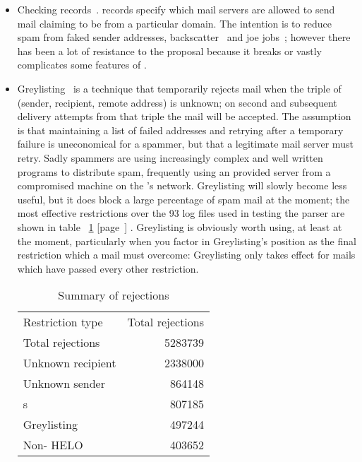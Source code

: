\documentclass[a4paper,12pt,draft]{article}
\newcommand{\refwithpage}[1]{%
    \empty{}\ref{#1} [page~\pageref{#1}]%
}
\begin{document}
\begin{itemize}

    \item Checking \SPF{} records~\cite{openspf, Wikipedia-spf}.
        \SPF{}\label{spf introduction}
        records specify which mail servers are allowed to send mail
        claiming to be from a particular domain.  The intention is to
        reduce spam from faked sender addresses,
        backscatter~\cite{postfix-backscatter} and joe
        jobs~\cite{Wikipedia-joe-job}; however there has been a lot of
        resistance to the proposal because it breaks or vastly complicates
        some features of \SMTP{}\@.

    \item Greylisting~\cite{greylisting} is a technique that temporarily
        rejects mail when the triple of (sender, recipient, remote \IP{}
        address) is unknown; on second and subsequent delivery attempts
        from that triple the mail will be accepted.  The assumption is that
        maintaining a list of failed addresses and retrying after a
        temporary failure is uneconomical for a spammer, but that a
        legitimate mail server must retry.  Sadly spammers are using
        increasingly complex and well written programs to distribute spam,
        frequently using an \ISP{} provided \SMTP{} server from a
        compromised machine on the \ISP{}'s network.  Greylisting will
        slowly become less useful, but it does block a large percentage of
        spam mail at the moment; the most effective restrictions over the
        93 log files used in testing the parser are shown in
        table~\refwithpage{Summary of rejections}.  Greylisting is
        obviously worth using, at least at the moment, particularly when
        you factor in Greylisting's position as the final restriction which
        a mail must overcome: Greylisting only takes effect for mails which
        have passed every other restriction.

        \begin{table}[ht]
            \caption{Summary of rejections}\label{Summary of rejections}
            \begin{tabular}[]{lr}
                Restriction type    & Total rejections  \\
                Total rejections    & 5283739           \\
                Unknown recipient   & 2338000           \\
                Unknown sender      & 864148            \\
                \RBL{}s             & 807185            \\
                Greylisting         & 497244            \\
                Non-\FQDN{} HELO    & 403652            \\
            \end{tabular}
        \end{table}


\end{itemize}
\end{document}
